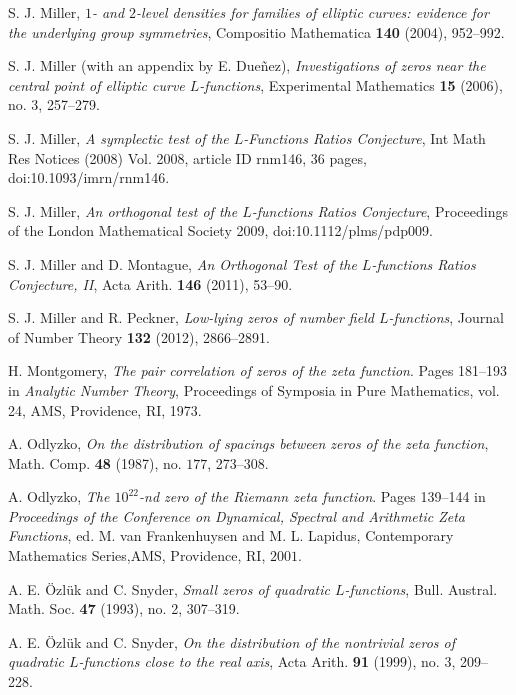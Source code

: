 \documentclass[12pt, reqno]{amsart}
\numberwithin{equation}{section}
\theoremstyle{definition}
\theoremstyle{remark}
\begin{document}
\begin{thebibliography}{FMGGGG15}
\newblock S. J. Miller, \emph{$1$- and $2$-level densities for families of elliptic
curves: evidence for the underlying group symmetries}, Compositio
Mathematica \textbf{140} (2004), 952--992.

S. J. Miller (with an appendix by E. Due\~nez), \emph{Investigations of zeros near the central point
of elliptic curve $L$-functions}, Experimental Mathematics \textbf{15} (2006), no. 3, 257--279.

S. J. Miller, \emph{A symplectic test of the $L$-Functions Ratios Conjecture}, Int Math Res Notices (2008) Vol. 2008, article ID rnm146, 36 pages, doi:10.1093/imrn/rnm146.

\newblock S. J. Miller, \emph{An orthogonal test of the $L$-functions Ratios Conjecture}, Proceedings of the London Mathematical Society 2009, doi:10.1112/plms/pdp009.

\newblock S. J. Miller and D. Montague, \emph{An Orthogonal Test of the $L$-functions Ratios Conjecture, II}, Acta Arith. \textbf{146} (2011), 53--90.

\newblock S. J. Miller and R. Peckner, \emph{Low-lying zeros of number field $L$-functions}, Journal of Number Theory \textbf{132} (2012), 2866--2891.

 H. Montgomery, \emph{The pair correlation of zeros of
  the zeta function}. Pages 181--193 in \emph{Analytic Number Theory},
  Proceedings of Symposia in Pure Mathematics, vol. 24, AMS,
  Providence, RI, 1973.

 A. Odlyzko, \emph{On the distribution of spacings
  between zeros of the zeta function}, Math. Comp. \textbf{48} (1987),
  no. $177$,  273--308.

 A. Odlyzko, \emph{The $10^{22}$-nd zero of the
  Riemann zeta function}. Pages  139--144 in \emph{Proceedings of the
  Conference on Dynamical, Spectral and Arithmetic Zeta Functions},
  ed. M. van Frankenhuysen and M. L. Lapidus, Contemporary Mathematics
  Series,AMS, Providence, RI, $2001$.

\newblock A. E. \"Ozl\"uk and C. Snyder, \emph{Small zeros of quadratic $L$-functions},
Bull. Austral. Math. Soc. \textbf{47} (1993), no. 2, 307--319.

\newblock A. E. \"Ozl\"uk and C. Snyder, \emph{On the distribution of the
nontrivial zeros of quadratic $L$-functions close to the real axis},
Acta Arith. \textbf{91} (1999), no. 3, 209--228.


\end{thebibliography}
\end{document}
